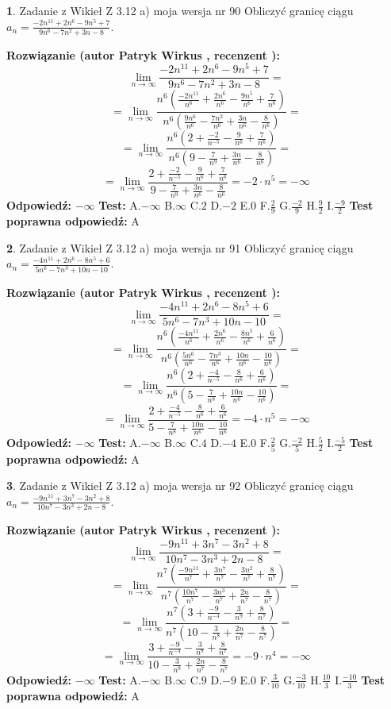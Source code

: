 \documentclass[12pt, a4paper]{article}
\theoremstyle{definition} %
\newtheorem{zad}{}
\newcommand{\zadStart}[1]{\begin{zad}#1\newline}
\newcommand{\zadStop}{\end{zad}}
\newcommand{\rozwStart}[2]{\noindent \textbf{Rozwiązanie (autor #1 , recenzent #2): }\newline}
\newcommand{\rozwStop}{\newline}
\newcommand{\odpStart}{\noindent \textbf{Odpowiedź:}\newline}
\newcommand{\odpStop}{\newline}
\newcommand{\testStart}{\noindent \textbf{Test:}\newline}
\newcommand{\testStop}{\newline}
\newcommand{\kluczStart}{\noindent \textbf{Test poprawna odpowiedź:}\newline}
\newcommand{\kluczStop}{\newline}
\begin{document}
\zadStart{Zadanie z Wikieł Z 3.12 a) moja wersja nr 90}
Obliczyć granicę ciągu $a_{n}=\frac{-2n^{11}+2n^{6}-9n^{5}+7}{9n^{6}-7n^{2}+3n-8}$.
\zadStop
\rozwStart{Patryk Wirkus}{}
$$\lim\limits_{n\to\infty}\frac{-2n^{11}+2n^{6}-9n^{5}+7}{9n^{6}-7n^{2}+3n-8}=$$
$$=\lim\limits_{n\to\infty}\frac{n^{6}\left(\frac{-2n^{11}}{n^{6}}+\frac{2n^{6}}{n^{6}}-\frac{9n^{5}}{n^{6}}+\frac{7}{n^{6}}\right)}{n^{6}\left(\frac{9n^{6}}{n^{6}}-\frac{7n^{2}}{n^{6}}+\frac{3n}{n^{6}}-\frac{8}{n^{6}}\right)}=$$
$$=\lim\limits_{n\to\infty}\frac{n^{6}\left(2+\frac{-2}{n^{-5}}-\frac{9}{n^{6}}+\frac{7}{n^{6}}\right)}
{n^{6}\left(9-\frac{7}{n^{9}}+\frac{3n}{n^{6}}-\frac{8}{n^{6}}\right)}=$$
$$=\lim\limits_{n\to\infty}\frac{2+\frac{-2}{n^{-5}}-\frac{9}{n^{6}}+\frac{7}{n^{6}}}{9-\frac{7}{n^{9}}+\frac{3n}{n^{6}}-\frac{8}{n^{6}}}=-2\cdot n^{5} = -\infty$$
\rozwStop
\odpStart
$-\infty$
\odpStop
\testStart
A.$-\infty$
B.$\infty$
C.$2$
D.$-2$
E.$0$
F.$\frac{2}{9}$
G.$\frac{-2}{9}$
H.$\frac{9}{2}$
I.$\frac{-9}{2}$
\testStop
\kluczStart
A
\kluczStop



\zadStart{Zadanie z Wikieł Z 3.12 a) moja wersja nr 91}
Obliczyć granicę ciągu $a_{n}=\frac{-4n^{11}+2n^{6}-8n^{5}+6}{5n^{6}-7n^{3}+10n-10}$.
\zadStop
\rozwStart{Patryk Wirkus}{}
$$\lim\limits_{n\to\infty}\frac{-4n^{11}+2n^{6}-8n^{5}+6}{5n^{6}-7n^{3}+10n-10}=$$
$$=\lim\limits_{n\to\infty}\frac{n^{6}\left(\frac{-4n^{11}}{n^{6}}+\frac{2n^{6}}{n^{6}}-\frac{8n^{5}}{n^{6}}+\frac{6}{n^{6}}\right)}{n^{6}\left(\frac{5n^{6}}{n^{6}}-\frac{7n^{3}}{n^{6}}+\frac{10n}{n^{6}}-\frac{10}{n^{6}}\right)}=$$
$$=\lim\limits_{n\to\infty}\frac{n^{6}\left(2+\frac{-4}{n^{-5}}-\frac{8}{n^{6}}+\frac{6}{n^{6}}\right)}
{n^{6}\left(5-\frac{7}{n^{8}}+\frac{10n}{n^{6}}-\frac{10}{n^{6}}\right)}=$$
$$=\lim\limits_{n\to\infty}\frac{2+\frac{-4}{n^{-5}}-\frac{8}{n^{6}}+\frac{6}{n^{6}}}{5-\frac{7}{n^{8}}+\frac{10n}{n^{6}}-\frac{10}{n^{6}}}=-4\cdot n^{5} = -\infty$$
\rozwStop
\odpStart
$-\infty$
\odpStop
\testStart
A.$-\infty$
B.$\infty$
C.$4$
D.$-4$
E.$0$
F.$\frac{2}{5}$
G.$\frac{-2}{5}$
H.$\frac{5}{2}$
I.$\frac{-5}{2}$
\testStop
\kluczStart
A
\kluczStop



\zadStart{Zadanie z Wikieł Z 3.12 a) moja wersja nr 92}
Obliczyć granicę ciągu $a_{n}=\frac{-9n^{11}+3n^{7}-3n^{2}+8}{10n^{7}-3n^{3}+2n-8}$.
\zadStop
\rozwStart{Patryk Wirkus}{}
$$\lim\limits_{n\to\infty}\frac{-9n^{11}+3n^{7}-3n^{2}+8}{10n^{7}-3n^{3}+2n-8}=$$
$$=\lim\limits_{n\to\infty}\frac{n^{7}\left(\frac{-9n^{11}}{n^{7}}+\frac{3n^{7}}{n^{7}}-\frac{3n^{2}}{n^{7}}+\frac{8}{n^{7}}\right)}{n^{7}\left(\frac{10n^{7}}{n^{7}}-\frac{3n^{3}}{n^{7}}+\frac{2n}{n^{7}}-\frac{8}{n^{7}}\right)}=$$
$$=\lim\limits_{n\to\infty}\frac{n^{7}\left(3+\frac{-9}{n^{-4}}-\frac{3}{n^{9}}+\frac{8}{n^{7}}\right)}
{n^{7}\left(10-\frac{3}{n^{8}}+\frac{2n}{n^{7}}-\frac{8}{n^{7}}\right)}=$$
$$=\lim\limits_{n\to\infty}\frac{3+\frac{-9}{n^{-4}}-\frac{3}{n^{9}}+\frac{8}{n^{7}}}{10-\frac{3}{n^{8}}+\frac{2n}{n^{7}}-\frac{8}{n^{7}}}=-9\cdot n^{4} = -\infty$$
\rozwStop
\odpStart
$-\infty$
\odpStop
\testStart
A.$-\infty$
B.$\infty$
C.$9$
D.$-9$
E.$0$
F.$\frac{3}{10}$
G.$\frac{-3}{10}$
H.$\frac{10}{3}$
I.$\frac{-10}{3}$
\testStop
\kluczStart
A
\kluczStop
\end{document}
